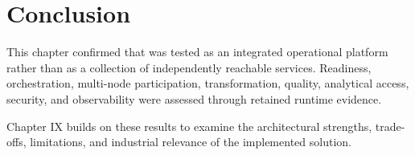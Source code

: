 \section{Conclusion}
This chapter confirmed that \projectname{} was tested as an integrated operational platform rather than as a collection of independently reachable services. Readiness, orchestration, multi-node participation, transformation, quality, analytical access, security, and observability were assessed through retained runtime evidence.

Chapter IX builds on these results to examine the architectural strengths, trade-offs, limitations, and industrial relevance of the implemented solution.
